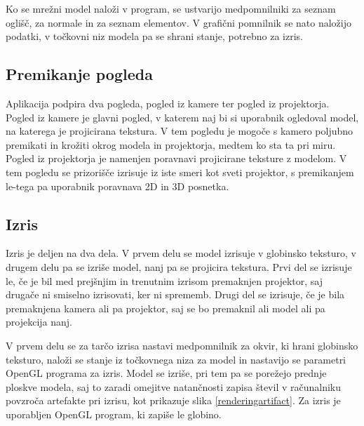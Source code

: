 \documentclass[a4paper, 12pt]{book}
\begin{document}
Ko se mrežni model naloži v program, se ustvarijo medpomnilniki za seznam oglišč, za normale in za seznam elementov. V grafični pomnilnik se nato naložijo podatki, v točkovni niz modela pa se shrani stanje, potrebno za izris. 

\subsection{Premikanje pogleda}

Aplikacija podpira dva pogleda, pogled iz kamere ter pogled iz projektorja. Pogled iz kamere je glavni pogled, v katerem naj bi si uporabnik ogledoval model, na katerega je projicirana tekstura. V tem pogledu je mogoče s kamero poljubno premikati in krožiti okrog modela in projektorja, medtem ko sta ta pri miru. Pogled iz projektorja je namenjen poravnavi projicirane teksture z modelom. V tem pogledu se prizorišče izrisuje iz iste smeri kot sveti projektor, s premikanjem le-tega pa uporabnik poravnava 2D in 3D posnetka.

\subsection{Izris}

Izris je deljen na dva dela. V prvem delu se model izrisuje v globinsko teksturo, v drugem delu pa se izriše model, nanj pa se projicira tekstura. Prvi del se izrisuje le, če je bil med prejšnjim in trenutnim izrisom premaknjen projektor, saj drugače ni smiselno izrisovati, ker ni sprememb. Drugi del se izrisuje, če je bila premaknjena kamera ali pa projektor, saj se bo premaknil ali model ali pa projekcija nanj.

V prvem delu se za tarčo izrisa nastavi medpomnilnik za okvir, ki hrani globinsko teksturo, naloži se stanje iz točkovnega niza za model in nastavijo se parametri OpenGL programa za izris. Model se izriše, pri tem pa se porežejo prednje ploskve modela, saj to zaradi omejitve natančnosti zapisa števil v računalniku povzroča artefakte pri izrisu, kot prikazuje slika \ref{renderingartifact}. Za izris je uporabljen OpenGL program, ki zapiše le globino.
\end{document}
